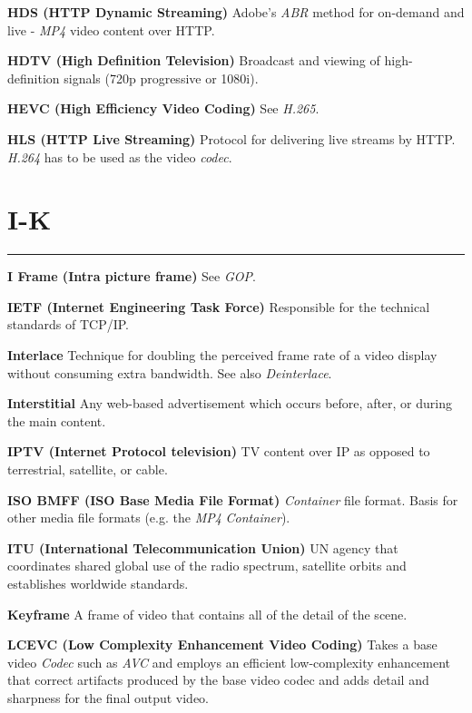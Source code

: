 \smallskip
\textbf{HDS (HTTP Dynamic Streaming)}
Adobe's \textit{ABR} method for on-demand and live - \textit{MP4} video content over HTTP.

\smallskip
\textbf{HDTV (High Definition Television)}
Broadcast and viewing of high-definition signals (720p progressive or 1080i).

\smallskip
\textbf{HEVC (High Efficiency Video Coding)}
See \textit{H.265}.

\smallskip
\textbf{HLS (HTTP Live Streaming)}
Protocol for delivering live streams by HTTP.  \textit{H.264} has to be used as the video \textit{codec}.


\section{I-K}
\hrule

\medskip
\textbf{I Frame (Intra picture frame)}
See \textit{GOP}.

\smallskip
\textbf{IETF (Internet Engineering Task Force)}
Responsible for the technical standards of TCP/IP.

\smallskip
\textbf{Interlace}
Technique for doubling the perceived frame rate of a video display without consuming extra bandwidth. See also \textit{Deinterlace}.

\smallskip
\textbf{Interstitial}
Any web-based advertisement which occurs before, after, or during the main content.

\smallskip
\textbf{IPTV (Internet Protocol television)}
TV content over IP as opposed to terrestrial, satellite, or cable.

\smallskip
\textbf{ISO BMFF (ISO Base Media File Format)}
\textit{Container} file format.  Basis for other media file formats (e.g. the \textit{MP4} \textit{Container}).

\smallskip
\textbf{ITU (International Telecommunication Union)}
UN agency that coordinates shared global use of the radio spectrum, satellite orbits and establishes worldwide standards.

\smallskip
\textbf{Keyframe}
A frame of video that contains all of the detail of the scene.

\smallskip
\textbf{LCEVC (Low Complexity Enhancement Video Coding)}
Takes a base video \textit{Codec} such as \textit{AVC} and employs an efficient low-complexity enhancement that correct artifacts produced by the base video codec and adds detail and sharpness for the final output video.

